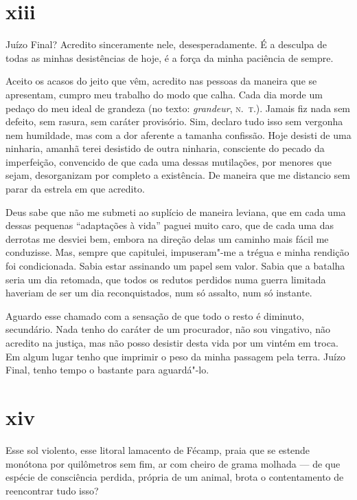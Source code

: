 \section{xiii}

Juízo Final? Acredito sinceramente nele, desesperadamente. É a desculpa
de todas as minhas desistências de hoje, é a força da minha paciência de
sempre.

Aceito os acasos do jeito que vêm, acredito nas pessoas da maneira que
se apresentam, cumpro meu trabalho do modo que calha. Cada dia morde um
pedaço do meu ideal de grandeza (no texto: \emph{grandeur}, \textsc{n.~t.}).
Jamais fiz nada sem defeito, sem rasura, sem caráter provisório. Sim,
declaro tudo isso sem vergonha nem humildade, mas com a dor aferente a
tamanha confissão. Hoje desisti de uma ninharia, amanhã terei desistido
de outra ninharia, consciente do pecado da imperfeição, convencido de
que cada uma dessas mutilações, por menores que sejam, desorganizam por
completo a existência. De maneira que me distancio sem parar da estrela
em que acredito.

Deus sabe que não me submeti ao suplício de maneira leviana, que em cada
uma dessas pequenas ``adaptações à vida'' paguei muito caro, que de
cada uma das derrotas me desviei bem, embora na direção delas um
caminho mais fácil me conduzisse. Mas, sempre que capitulei,
impuseram"-me a trégua e minha rendição foi condicionada. Sabia estar
assinando um papel sem valor. Sabia que a batalha seria um dia retomada,
que todos os redutos perdidos numa guerra limitada haveriam de ser um
dia reconquistados, num só assalto, num só instante.

Aguardo esse chamado com a sensação de que todo o resto é diminuto,
secundário. Nada tenho do caráter de um procurador, não sou vingativo,
não acredito na justiça, mas não posso desistir desta vida por um vintém
em troca. Em algum lugar tenho que imprimir o peso da minha passagem
pela terra. Juízo Final, tenho tempo o bastante para aguardá"-lo.

\section{xiv}


Esse sol violento, esse litoral lamacento de Fécamp, praia que se
estende monótona por quilômetros sem fim, ar com cheiro de grama
molhada --- de que espécie de consciência perdida, própria de um animal,
brota o contentamento de reencontrar tudo isso?

